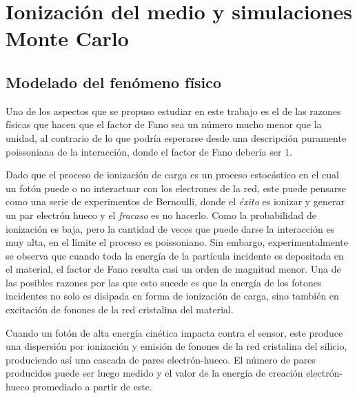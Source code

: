 \chapter{Ionización del medio y simulaciones Monte Carlo \label{chap:simulaciones}}
\section{Modelado del fenómeno físico}
\noindent Uno de los aspectos que se propuso estudiar en este trabajo es el de las razones físicas que hacen que el factor de Fano sea un número mucho menor que la unidad, al contrario de lo que podría esperarse desde una descripción puramente poissoniana de la interacción, donde el factor de Fano debería ser $1$.

Dado que el proceso de ionización de carga es un proceso estocástico en el cual un fotón puede o no interactuar con los electrones de la red, este puede pensarse como una serie de experimentos de Bernoulli, donde el \textit{éxito} es ionizar y generar un par electrón hueco y el \textit{fracaso} es no hacerlo. Como la probabilidad de ionización es baja, pero la cantidad de veces que puede darse la interacción es muy alta, en el límite el proceso es poissoniano. Sin embargo, experimentalmente se observa que cuando toda la energía de la partícula incidente es depositada en el material, el factor de Fano resulta casi un orden de magnitud menor\cite{TesisKevin}. Una de las posibles razones por las que esto sucede es que la energía de los fotones incidentes no solo es disipada en forma de ionización de carga, sino también en excitación de fonones de la red cristalina del material.

Cuando un fotón de alta energía cinética impacta contra el sensor, este produce una dispersión por ionización y emisión de fonones de la red cristalina del silicio, produciendo así una cascada de pares electrón-hueco. El número de pares producidos puede ser luego medido y el valor de la energía de creación electrón-hueco promediado a partir de este.

